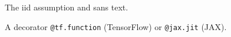 The {\sc iid} assumption and {\sf sans} text.

A decorator \texttt{{@}tf.function} (TensorFlow) or \texttt{{@}jax.jit} (JAX).
